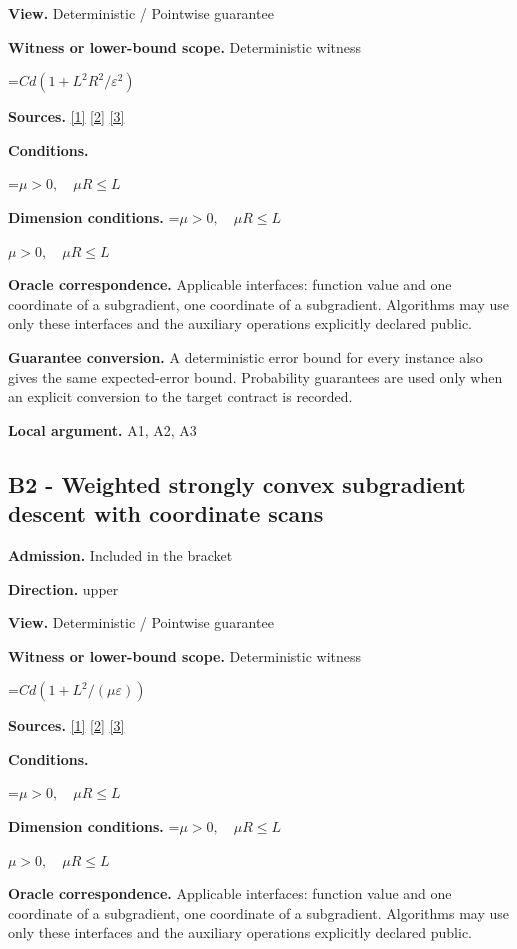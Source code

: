 \documentclass[10pt,a4paper]{article}
\newcommand{\AtlasMath}[1]{\par\begingroup\centering\setbox0=\hbox{$\displaystyle #1$}\ifdim\wd0>1.4\linewidth\typeout{ATLAS WIDE FORMULA: \the\wd0}\fi\ifdim\wd0>\linewidth\resizebox{\linewidth}{!}{\box0}\else\box0\fi\par\endgroup}
\newcommand{\AtlasInlineMath}[1]{\begingroup\setbox0=\hbox{$#1$}\ifdim\wd0>.4\linewidth\endgroup\AtlasMath{#1}\else\endgroup$#1$\fi}
\begin{document}
\textbf{View.} Deterministic / Pointwise guarantee

\textbf{Witness or lower-bound scope.} Deterministic witness

\AtlasMath{Cd(1+L^2R^2/\varepsilon^2)}
\textbf{Sources.} \href{https://arxiv.org/pdf/1405.4980}{[1]} \href{https://www2.isye.gatech.edu/~nemirovs/MOR_AccuracyCertificates.pdf}{[2]} \href{https://arxiv.org/pdf/2609.20701}{[3]}

\textbf{Conditions.} 
\AtlasMath{\mu>0,\quad\mu R\le L}


\textbf{Dimension conditions.} \AtlasInlineMath{\mu>0,\quad\mu R\le L}

\textbf{Oracle correspondence.} Applicable interfaces: function value and one coordinate of a subgradient, one coordinate of a subgradient. Algorithms may use only these interfaces and the auxiliary operations explicitly declared public.

\textbf{Guarantee conversion.} A deterministic error bound for every instance also gives the same expected-error bound. Probability guarantees are used only when an explicit conversion to the target contract is recorded.

\textbf{Local argument.} A1, A2, A3

\subsection{B2 - Weighted strongly convex subgradient descent with coordinate scans}
\textbf{Admission.} Included in the bracket

\textbf{Direction.} upper

\textbf{View.} Deterministic / Pointwise guarantee

\textbf{Witness or lower-bound scope.} Deterministic witness

\AtlasMath{Cd(1+L^2/(\mu\varepsilon))}
\textbf{Sources.} \href{https://arxiv.org/pdf/1405.4980}{[1]} \href{https://www2.isye.gatech.edu/~nemirovs/MOR_AccuracyCertificates.pdf}{[2]} \href{https://arxiv.org/pdf/2609.20701}{[3]}

\textbf{Conditions.} 
\AtlasMath{\mu>0,\quad\mu R\le L}


\textbf{Dimension conditions.} \AtlasInlineMath{\mu>0,\quad\mu R\le L}

\textbf{Oracle correspondence.} Applicable interfaces: function value and one coordinate of a subgradient, one coordinate of a subgradient. Algorithms may use only these interfaces and the auxiliary operations explicitly declared public.
\end{document}
